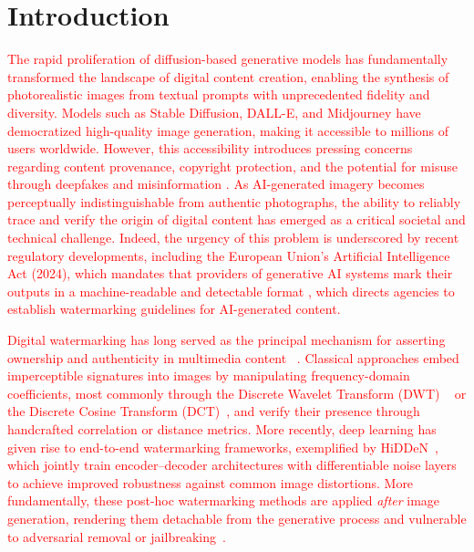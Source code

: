 \section{Introduction}
\label{sec:intro}

\textcolor{red}{
The rapid proliferation of diffusion-based generative models \cite{ho2020denoising,rombach2022high} has fundamentally transformed the landscape of digital content creation, enabling the synthesis of photorealistic images from textual prompts with unprecedented fidelity and diversity. Models such as Stable Diffusion, DALL-E, and Midjourney have democratized high-quality image generation, making it accessible to millions of users worldwide. However, this accessibility introduces pressing concerns regarding content provenance, copyright protection, and the potential for misuse through deepfakes and misinformation \cite{liu2025review, gupta2024comprehensive,bird2023typology,Rijsbosch2025watermarking}. As AI-generated imagery becomes perceptually indistinguishable from authentic photographs, the ability to reliably trace and verify the origin of digital content has emerged as a critical societal and technical challenge. Indeed, the urgency of this problem is underscored by recent regulatory developments, including the European Union's Artificial Intelligence Act (2024), which mandates that providers of generative AI systems mark their outputs in a machine-readable and detectable format \cite{euaiact2024}, which directs agencies to establish watermarking guidelines for AI-generated content.}

\textcolor{red}{
Digital watermarking has long served as the principal mechanism for asserting ownership and authenticity in multimedia content ~\cite{barni2001improved,cox2008digital}. Classical approaches embed imperceptible signatures into images by manipulating frequency-domain coefficients, most commonly through the Discrete Wavelet Transform (DWT) ~\cite{raval2003discrete,tian2023multi} or the Discrete Cosine Transform (DCT)~\cite{shensa2002discrete}, and verify their presence through handcrafted correlation or distance metrics. More recently, deep learning has given rise to end-to-end watermarking frameworks, exemplified by HiDDeN~\cite{zhu2018hidden}, which jointly train encoder–decoder architectures with differentiable noise layers to achieve improved robustness against common image distortions. More fundamentally, these post-hoc watermarking methods are applied \emph{after} image generation, rendering them detachable from the generative process and vulnerable to adversarial removal or jailbreaking~\cite{zhao2024invisible}.}

